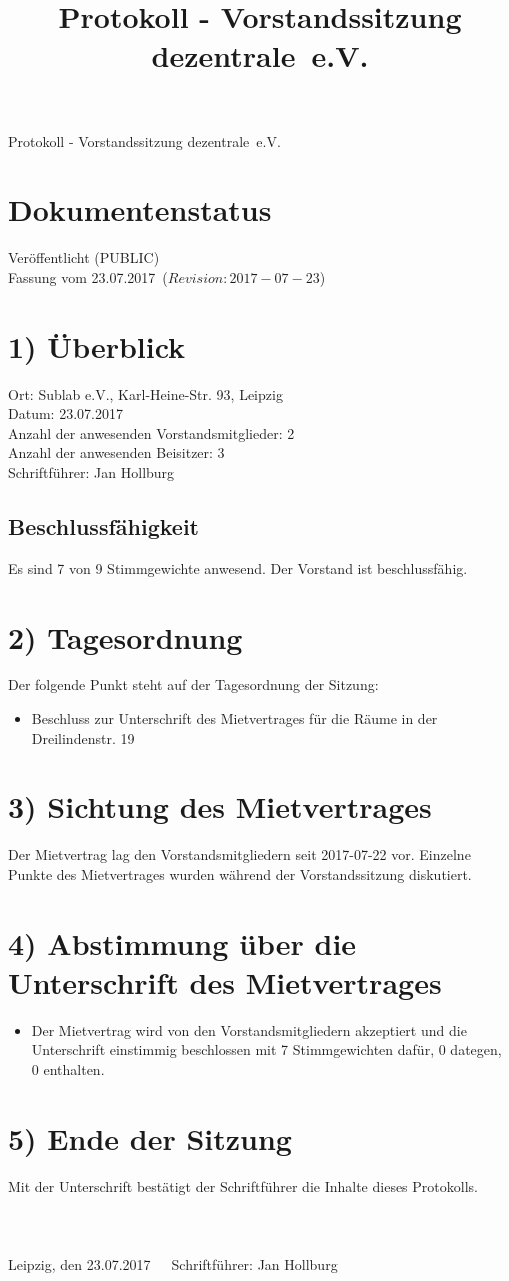 \documentclass[10pt,a4paper]{scrartcl}
\newcommand{\qs}[1]{\glqq#1\grqq}
\newcommand{\name}{dezentrale}
\newcommand{\revision}{$Revision: 2017-07-23$}
\newcommand{\eventdate}{23.07.2017}
\newcommand{\schriftfuehrer}{Jan Hollburg}
\newcommand{\documentstatus}{Ver{\"o}ffentlicht (PUBLIC)}
\begin{document}
\title{Protokoll - Vorstandssitzung \qs{\name\ e.V.}}
{\LARGE Protokoll - Vorstandssitzung \qs{\name\ e.V.}}

\section*{Dokumentenstatus}
\documentstatus\\
Fassung vom \eventdate\ (\revision)

\section*{1) {\"U}berblick}
    Ort: Sublab e.V., Karl-Heine-Str. 93, Leipzig\\
    Datum: \eventdate\\
    Anzahl der anwesenden Vorstandsmitglieder: 2\\
    Anzahl der anwesenden Beisitzer: 3\\
    Schriftf{\"u}hrer: \schriftfuehrer
\subsection*{Beschlussf{\"a}higkeit}
    Es sind 7 von 9 Stimmgewichte anwesend. Der Vorstand ist beschlussf{\"a}hig.

\section*{2) Tagesordnung}
    Der folgende Punkt steht auf der Tagesordnung der Sitzung:
	\begin{itemize}
        \item Beschluss zur Unterschrift des Mietvertrages für die Räume in der \qs{Dreilindenstr. 19}
    \end{itemize}

\section*{3) Sichtung des Mietvertrages}
	Der Mietvertrag lag den Vorstandsmitgliedern seit 2017-07-22 vor. Einzelne Punkte
	des Mietvertrages wurden w{\"a}hrend der Vorstandssitzung diskutiert.

\section*{4) Abstimmung {\"u}ber die Unterschrift des Mietvertrages}
    \begin{itemize}
        \item Der Mietvertrag wird von den Vorstandsmitgliedern akzeptiert und die Unterschrift einstimmig beschlossen mit 7 Stimmgewichten daf{\"u}r, 0 dategen, 0 enthalten.\\
    \end{itemize}

\section*{5) Ende der Sitzung}
    Mit der Unterschrift best{\"a}tigt der Schriftf{\"u}hrer die Inhalte dieses Protokolls.
\\
\\
\\
\\
Leipzig, den \eventdate \ \ \ Schriftf{\"u}hrer: \schriftfuehrer
\end{document}
